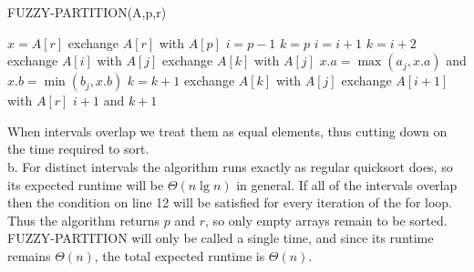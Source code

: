\documentclass{article}
\begin{document}
\begin{algorithm}
\caption{FUZZY-PARTITION(A,p,r)}
\begin{algorithmic}[1]
\State $x = A[r]$
\State exchange $A[r]$ with $A[p]$
\State $i=p-1$
\State $k = p$
		\State $i=i+1$
		\State $k = i+2$
		\State exchange $A[i]$ with $A[j]$
		\State exchange $A[k]$ with $A[j]$
	\EndIf
		\State $x.a = \max(a_j, x.a)$ and $x.b = \min(b_j, x.b)$
		\State $k = k+1$
		\State exchange $A[k]$ with $A[j]$
	\EndIf
\EndFor
\State exchange $A[i+1]$ with $A[r]$
\State \Return $i+1$ and $k+1$
\end{algorithmic}
\end{algorithm}
When intervals overlap we treat them as equal elements, thus cutting down on the time required to sort.  \\

b. For distinct intervals the algorithm runs exactly as regular quicksort does, so its expected runtime will be $\Theta(n \lg n)$ in general.  If all of the intervals overlap then the condition on line 12 will be satisfied for every iteration of the for loop.  Thus the algorithm returns $p$ and $r$, so only empty arrays remain to be sorted. FUZZY-PARTITION will only be called a single time, and since its runtime remains $\Theta(n)$, the total expected runtime is $\Theta(n)$.
\end{document}
